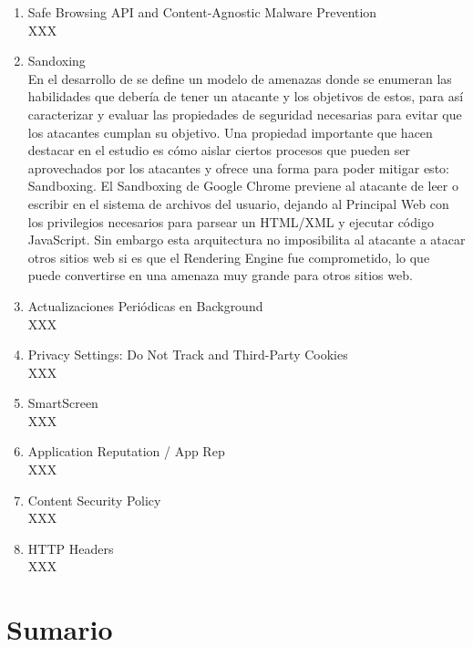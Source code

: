     \begin{enumerate}
        \item Safe Browsing API and Content-Agnostic Malware Prevention
        \\XXX 

        \item Sandoxing
        \\En el desarrollo de \cite{barth2008security} se define un modelo de amenazas donde se enumeran las habilidades que debería de tener un atacante y los objetivos de estos, para así caracterizar y evaluar las propiedades de seguridad necesarias para evitar que los atacantes cumplan su objetivo. Una propiedad importante que hacen destacar en el estudio es cómo aislar ciertos procesos que pueden ser aprovechados por los atacantes y ofrece una forma para poder mitigar esto: Sandboxing. El Sandboxing de Google Chrome previene al atacante de leer o escribir en el sistema de archivos del usuario, dejando al Principal Web con los privilegios necesarios para parsear un HTML/XML y ejecutar código JavaScript. Sin embargo esta arquitectura no imposibilita al atacante a atacar otros sitios web si es que el Rendering Engine fue comprometido, lo que puede convertirse en una amenaza muy grande para otros sitios web.

        \item Actualizaciones Periódicas en Background
        \\XXX

        \item Privacy Settings: Do Not Track and Third-Party Cookies
        \\XXX


        \item SmartScreen
        \\XXX
        
        \item Application Reputation / App Rep
        \\XXX


        \item Content Security Policy
        \\XXX


        \item HTTP Headers
        \\XXX

    \end{enumerate}




\section{Sumario}
\label{chap3:Summ}